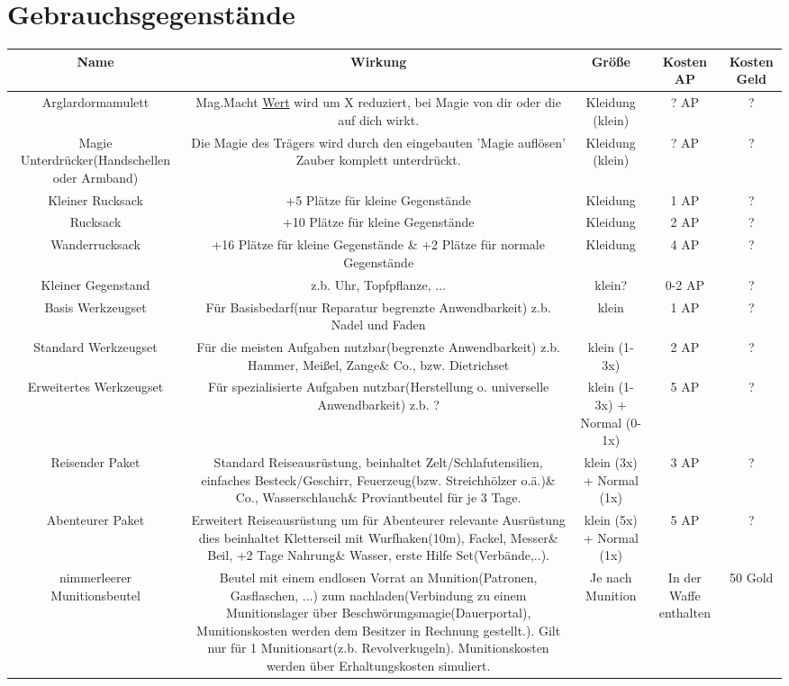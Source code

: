 \section{Gebrauchsgegenstände}
\begin{tabulary}{\textwidth}{|C|C|C|C|C|}
\hline 
Name&Wirkung&Größe&Kosten AP &Kosten Geld\\ 
\hline
Arglardormamulett& 
Mag.Macht \underline{Wert} wird um X reduziert, bei Magie von dir oder die auf dich wirkt. &
Kleidung (klein)	&? AP&?\\
\hline
Magie Unterdrücker(Handschellen oder Armband)& 
Die Magie des Trägers wird durch den eingebauten 'Magie auflösen' Zauber komplett unterdrückt. &
Kleidung (klein)	&? AP&?\\
\hline
Kleiner Rucksack& 
+5 Plätze für kleine Gegenstände &
Kleidung	&1 AP&?\\
\hline
Rucksack& 
+10 Plätze für kleine Gegenstände &
Kleidung	&2 AP&?\\
\hline
Wanderrucksack& 
+16 Plätze für kleine Gegenstände \& +2 Plätze für normale Gegenstände &
Kleidung	&4 AP&?\\
\hline
Kleiner Gegenstand& 
z.b. Uhr, Topfpflanze, ...&
klein?	&0-2 AP&?\\
\hline 
Basis Werkzeugset& 
Für Basisbedarf(nur Reparatur begrenzte Anwendbarkeit) z.b. Nadel und Faden&
klein	&1 AP&?\\
\hline 
Standard Werkzeugset& 
Für die meisten Aufgaben nutzbar(begrenzte Anwendbarkeit) z.b. Hammer, Meißel, Zange\& Co., bzw. Dietrichset&
klein (1-3x)	&2 AP&?\\
\hline 
Erweitertes Werkzeugset& 
Für spezialisierte Aufgaben nutzbar(Herstellung o. universelle Anwendbarkeit) z.b. ?&
klein (1-3x) + Normal (0-1x)	&5 AP&?\\
\hline 
Reisender Paket& 
Standard Reiseausrüstung, beinhaltet Zelt/Schlafutensilien, einfaches Besteck/Geschirr, Feuerzeug(bzw. Streichhölzer o.ä.)\& Co., Wasserschlauch\& Proviantbeutel für je 3 Tage.&
klein (3x) + Normal (1x)	&3 AP&?\\
\hline 
Abenteurer Paket& 
Erweitert Reiseausrüstung um für Abenteurer relevante Ausrüstung dies beinhaltet Kletterseil mit Wurfhaken(10m), Fackel, Messer\& Beil, +2 Tage Nahrung\& Wasser, erste Hilfe Set(Verbände,..).&
klein (5x) + Normal (1x)	&5 AP&?\\
\hline 
nimmerleerer Munitionsbeutel& 
Beutel mit einem endlosen Vorrat an Munition(Patronen, Gasflaschen, ...) zum nachladen(Verbindung zu einem Munitionslager über Beschwörungsmagie(Dauerportal), Munitionskosten werden dem Besitzer in Rechnung gestellt.).
 Gilt nur für 1 Munitionsart(z.b. Revolverkugeln).
 Munitionskosten werden über Erhaltungskosten simuliert.&
Je nach Munition&In der Waffe enthalten&50 Gold\\
\hline 
\end{tabulary}